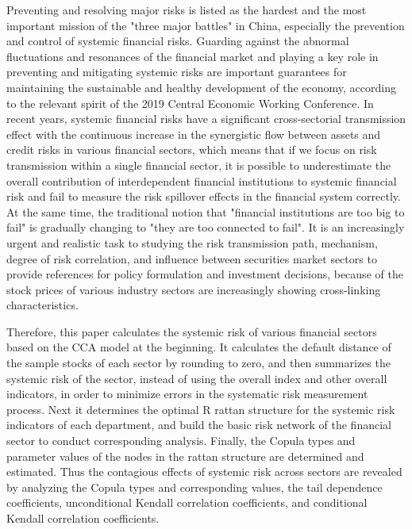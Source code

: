 \begin{eabstract}
  Preventing and resolving major risks is listed as the hardest and the
most important mission of the "three major battles" in China, especially
the prevention and control of systemic financial risks. Guarding against
the abnormal fluctuations and resonances of the financial market and
playing a key role in preventing and mitigating systemic risks are
important guarantees for maintaining the sustainable and healthy
development of the economy, according to the relevant spirit of the 2019
Central Economic Working Conference. In recent years, systemic financial
risks have a significant cross-sectorial transmission effect with the
continuous increase in the synergistic flow between assets and credit
risks in various financial sectors, which means that if we focus on risk
transmission within a single financial sector, it is possible to
underestimate the overall contribution of interdependent financial
institutions to systemic financial risk and fail to measure the risk
spillover effects in the financial system correctly. At the same time,
the traditional notion that "financial institutions are too big to fail"
is gradually changing to "they are too connected to fail". It is an
increasingly urgent and realistic task to studying the risk transmission
path, mechanism, degree of risk correlation, and influence between
securities market sectors to provide references for policy formulation
and investment decisions, because of the stock prices of various
industry sectors are increasingly showing cross-linking characteristics.

Therefore, this paper calculates the systemic risk of various financial
sectors based on the CCA model at the beginning. It calculates the
default distance of the sample stocks of each sector by rounding to
zero, and then summarizes the systemic risk of the sector, instead of
using the overall index and other overall indicators, in order to
minimize errors in the systematic risk measurement process. Next it
determines the optimal R rattan structure for the systemic risk
indicators of each department, and build the basic risk network of the
financial sector to conduct corresponding analysis. Finally, the Copula
types and parameter values of the nodes in the rattan structure are
determined and estimated. Thus the contagious effects of systemic risk
across sectors are revealed by analyzing the Copula types and
corresponding values, the tail dependence coefficients, unconditional
Kendall correlation coefficients, and conditional Kendall correlation
coefficients.


\end{eabstract}
